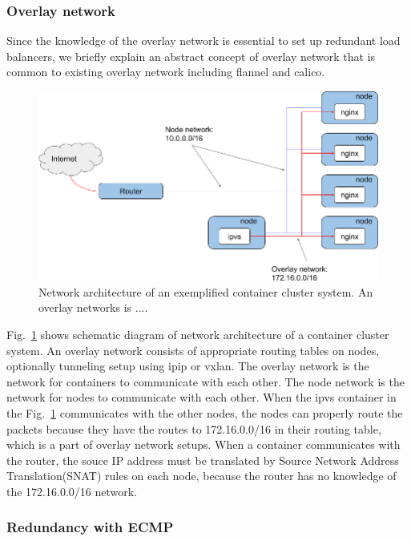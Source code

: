 \subsubsection{Overlay network}
Since the knowledge of the overlay network is essential to set up redundant load balancers,
we briefly explain an abstract concept of overlay network that is common to existing overlay network including flannel\cite{coreos_2018} and calico\cite{project_calico}.

\begin{figure}[tb]
\begin{center}
\includegraphics[width=\columnwidth]{Figs/overlay.png}
\end{center}
\caption{Network architecture of an exemplified container cluster system. An overlay networks is .... }
\label{fig:overlay}
\end{figure}

Fig.~\ref{fig:overlay} shows schematic diagram of network architecture of a container cluster system. 
An overlay network consists of appropriate routing tables on nodes, optionally tunneling setup using ipip or vxlan.
The overlay network is the network for containers to communicate with each other. 
The node network is the network for nodes to communicate with each other.
When the ipvs container in the Fig.~\ref{fig:overlay} communicates with the other nodes, 
the nodes can properly route the packets because they have the routes to 172.16.0.0/16 in their routing table, 
which is a part of overlay network setups.
When a container communicates with the router, the souce IP address must be translated by Source Network Address Translation(SNAT) rules on each node, 
because the router has no knowledge of the 172.16.0.0/16 network.

\subsubsection{Redundancy with ECMP}

